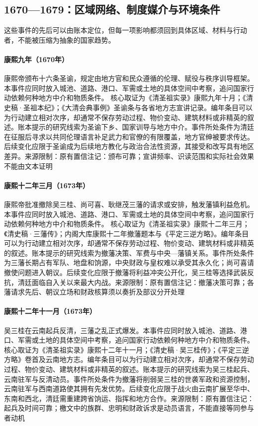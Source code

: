 \subsection{1670—1679：区域网络、制度媒介与环境条件}
这些事件的先后可以由账本定位，但每一项影响都须回到具体区域、材料与行动者，不能被压缩为抽象的国家趋势。
\hypertarget{civic:EQ-1670-SACRED-EDICT}{}\paragraph{康熙九年（1670年）}康熙帝颁布十六条圣谕，规定由地方官和民众遵循的伦理、赋役与秩序训导框架。本事件应同时放入城池、道路、港口、军需或土地的具体空间中考察，追问国家行动依赖何种地方中介和物质条件。 核心取证为《清圣祖实录》康熙九年十月；《清史稿·圣祖本纪》；《大清会典事例》圣谕条与各省地方志宣讲记录。编年条目可以为行动建立相对次序，却通常不保存劳动过程、物价变动、建筑材料或非精英的叙述。账本提示的研究线索为圣谕下乡、国家训导与地方中介。事件所处条件为清廷在征服后寻求以共同伦理语言补足武力和官僚的有限覆盖，地方官绅被要求传达。后续变化应限于圣谕成为后续地方教化与政治合法性资源，其接受和改写具有地区差异。来源限制：原有置信注记：颁布可靠；宣讲频率、识读范围和实际社会效果不能由文本证明
\hypertarget{civic:EQ-1673-FEUDATORY-ABOLITION}{}\paragraph{康熙十二年三月（1673年）}康熙帝批准撤除吴三桂、尚可喜、耿继茂三藩的请求或安排，触发藩镇利益危机。本事件应同时放入城池、道路、港口、军需或土地的具体空间中考察，追问国家行动依赖何种地方中介和物质条件。 核心取证为《清圣祖实录》康熙十二年三月；《清史稿·三藩传》；内阁大库康熙十二年撤藩题本与《平定三逆方略》。编年条目可以为行动建立相对次序，却通常不保存劳动过程、物价变动、建筑材料或非精英的叙述。账本提示的研究线索为撤藩决策、军费与中央—藩镇关系。事件所处条件为三藩长期占有军队、地盘和饷源，中央财政与皇权难以承受其永久化；尚可喜请撤使问题进入朝议。后续变化应限于撤藩将利益冲突公开化，吴三桂等选择武装反抗，清廷面临自入关以来最大内战。来源限制：原有置信注记：撤藩决策可靠；各藩请求先后、朝议立场和财政核算须以奏折及部议分开处理
\hypertarget{civic:EQ-1673-WU-REVOLT}{}\paragraph{康熙十二年十一月（1673年）}吴三桂在云南起兵反清，三藩之乱正式爆发。本事件应同时放入城池、道路、港口、军需或土地的具体空间中考察，追问国家行动依赖何种地方中介和物质条件。 核心取证为《清圣祖实录》康熙十二年十一月；《清史稿·吴三桂传》；《平定三逆方略》卷首及云南地方志。编年条目可以为行动建立相对次序，却通常不保存劳动过程、物价变动、建筑材料或非精英的叙述。账本提示的研究线索为吴三桂起兵、云南驻军与反清动员。事件所处条件为撤藩将削弱吴三桂的世袭军政和资源控制，云南驻军与西南道路使其拥有先发优势。后续变化应限于战火由云南扩展至华中、东南和西北，清廷需重建跨省饷运、指挥和地方合作。来源限制：原有置信注记：起兵及时间可靠；檄文中的族群、忠明和财政诉求是动员语言，不能直接等同参与者动机
